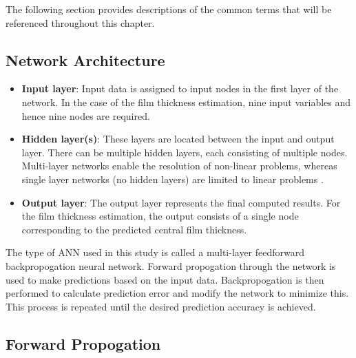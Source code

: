 The following section provides descriptions of the common terms that will be referenced throughout this chapter.

\subsection{Network Architecture}
\begin{itemize}
	\item \textbf{Input layer}: Input data is assigned to input nodes in the first layer of the network. In the case of the film thickness estimation, nine input variables and hence nine nodes are required.
	\item \textbf{Hidden layer(s)}: These layers are located between the input and output layer. There can be multiple hidden layers, each consisting of multiple nodes. Multi-layer networks enable the resolution of non-linear problems, whereas single layer networks (no hidden layers) are limited to linear problems \cite{Bell2014}.
	\item \textbf{Output layer}: The output layer represents the final computed results. For the film thickness estimation, the output consists of a single node corresponding to the predicted central film thickness.
\end{itemize}

The type of ANN used in this study is called a multi-layer feedforward backpropogation neural network. Forward propogation through the network is used to make predictions based on the input data. Backpropogation is then performed to calculate prediction error and modify the network to minimize this. This process is repeated until the desired prediction accuracy is achieved.

\subsection{Forward Propogation}

